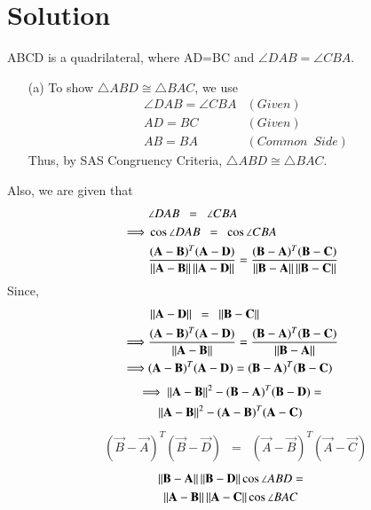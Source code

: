 \documentclass[journal,12pt,twocolumn]{IEEEtran}
\begin{document}
\section{Solution}
ABCD is a quadrilateral, where AD=BC and $\angle DAB= \angle CBA$.
\begin{enumerate}
\item[(a)] To show $\triangle ABD \cong \triangle BAC$, we use
\begin{align}
	& \angle DAB = \angle CBA & (Given) \\
	& AD = BC & (Given) \\
	& AB = BA & (Common \enspace Side)
\end{align}
Thus, by SAS Congruency Criteria, $\triangle ABD \cong \triangle BAC$.
\end{enumerate}
Also, we are given that
\begin{align}
 & \angle DAB \enspace = \enspace \angle CBA \\
 \implies &\cos\angle DAB \enspace = \enspace \cos\angle CBA \\
 &  \frac{(\mathbf A -\mathbf B)^T(\mathbf{A}-\mathbf{D})}{\left\lVert\mathbf{A}-\mathbf{B}\right\rVert \left\lVert\mathbf{A}-\mathbf{D}\right\rVert } = \frac{(\mathbf B -\mathbf A)^T(\mathbf{B}-\mathbf{C})}{\left\lVert\mathbf{B}-\mathbf{A}\right\rVert \left\lVert\mathbf{B}-\mathbf{C}\right\rVert}
 \end{align}
Since,
\begin{align}
	& \left\lVert\mathbf{A}-\mathbf{D}\right\rVert \enspace = \enspace \left\lVert\mathbf{B}-\mathbf{C}\right\rVert \\
	\implies & \frac{(\mathbf A -\mathbf B)^T(\mathbf{A}-\mathbf{D})}{\left\lVert\mathbf{A}-\mathbf{B}\right\rVert} = \frac{(\mathbf B -\mathbf A)^T(\mathbf{B}-\mathbf{C})}{\left\lVert\mathbf{B}-\mathbf{A}\right\rVert} \\
    \implies & (\mathbf A -\mathbf B)^T(\mathbf{A}-\mathbf{D}) =  (\mathbf B -\mathbf A)^T(\mathbf{B}-\mathbf{C})
\end{align}
\begin{multline}
 \implies \left\lVert\mathbf{A}-\mathbf{B}\right\rVert^2 - (\mathbf B -\mathbf A)^T(\mathbf{B}-\mathbf{D})  =\\ \left\lVert\mathbf{A}-\mathbf{B}\right\rVert^2 - (\mathbf A -\mathbf B)^T(\mathbf{A}-\mathbf{C}) 
\end{multline}
\begin{align}
& (\vec B -\vec A)^T(\vec{B}-\vec{D}) \enspace = \enspace  (\vec A -\vec B)^T(\vec{A}-\vec{C})\label{1}
\end{align}
\begin{multline}
 \left\lVert\mathbf{B} - \mathbf{A}\right\rVert\left\lVert\mathbf{B} - \mathbf{D}\right\rVert\cos\angle ABD  = \\ \left\lVert\mathbf{A} - \mathbf{B}\right\rVert\left\lVert\mathbf{A} - \mathbf{C}\right\rVert\cos\angle BAC 	
\end{multline}
\end{document}
